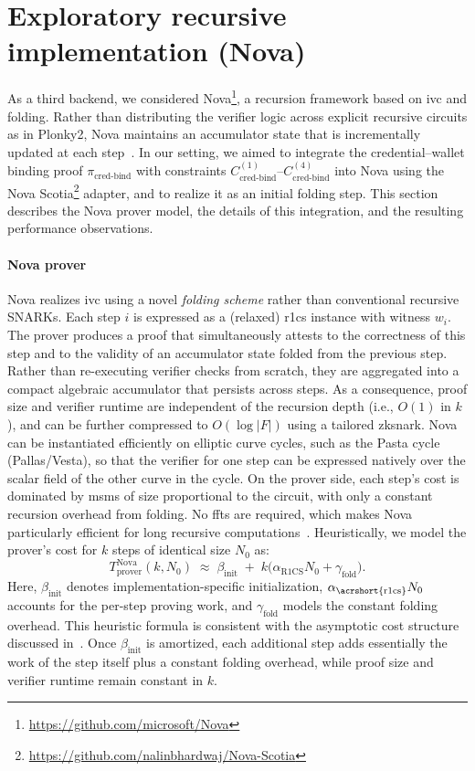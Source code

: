\section{Exploratory recursive implementation (Nova)}
\label{sec:recursive-nova}
As a third backend, we considered Nova\footnote{\url{https://github.com/microsoft/Nova}}, a recursion framework based on \acrfull{ivc} and folding. Rather than distributing the verifier logic across explicit recursive circuits as in Plonky2, Nova maintains an accumulator state that is incrementally updated at each step~\cite{cryptoeprint:2021/370}. In our setting, we aimed to integrate the credential–wallet binding proof $\pi_{\text{cred-bind}}$ with constraints $C_{\text{cred-bind}}^{(1)}$--$C_{\text{cred-bind}}^{(4)}$ into Nova using the Nova Scotia\footnote{\url{https://github.com/nalinbhardwaj/Nova-Scotia}} adapter, and to realize it as an initial folding step. This section describes the Nova prover model, the details of this integration, and the resulting performance observations.

\paragraph{Nova prover}  
Nova realizes \acrshort{ivc} using a novel \emph{folding scheme} rather than conventional recursive SNARKs. Each step $i$ is expressed as a (relaxed) \acrshort{r1cs} instance with witness $w_i$. The prover produces a proof that simultaneously attests to the correctness of this step and to the validity of an accumulator state folded from the previous step. Rather than re-executing verifier checks from scratch, they are aggregated into a compact algebraic accumulator that persists across steps. As a consequence, proof size and verifier runtime are independent of the recursion depth (i.e., $O(1)$ in $k$), and can be further compressed to $O(\log |F|)$ using a tailored \acrshort{zksnark}. Nova can be instantiated efficiently on elliptic curve cycles, such as the Pasta cycle (Pallas/Vesta), so that the verifier for one step can be expressed natively over the scalar field of the other curve in the cycle. On the prover side, each step’s cost is dominated by \acrshort{msm}s of size proportional to the circuit, with only a constant recursion overhead from folding. No \acrshort{fft}s are required, which makes Nova particularly efficient for long recursive computations~\cite{cryptoeprint:2021/370}. Heuristically, we model the prover’s cost for $k$ steps of identical size $N_0$ as:
\[
T_{\text{prover}}^{\text{Nova}}(k,N_0) \;\approx\; \beta_{\text{init}} \;+\; k\big(\alpha_{\text{R1CS}}N_0 + \gamma_{\text{fold}}\big).
\]  
Here, $\beta_{\text{init}}$ denotes implementation-specific initialization, $\alpha_{\text{\acrshort{r1cs}}} N_0$ accounts for the per-step proving work, and $\gamma_{\text{fold}}$ models the constant folding overhead. This heuristic formula is consistent with the asymptotic cost structure discussed in~\cite{cryptoeprint:2021/370}. Once $\beta_{\text{init}}$ is amortized, each additional step adds essentially the work of the step itself plus a constant folding overhead, while proof size and verifier runtime remain constant in $k$.  

